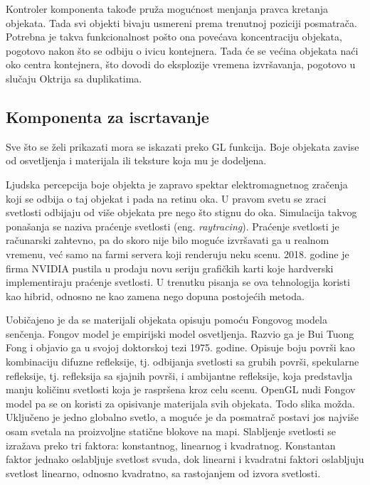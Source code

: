 \documentclass[12pt,oneside]{memoir}
\begin{document}
Kontroler komponenta takođe pruža mogućnost menjanja pravca kretanja objekata. 
Tada svi objekti bivaju usmereni prema trenutnoj poziciji posmatrača. 
Potrebna je takva funkcionalnost pošto ona povećava koncentraciju objekata, 
pogotovo nakon što se odbiju o ivicu kontejnera. Tada će se većina objekata 
naći oko centra kontejnera, što dovodi do eksplozije vremena izvršavanja, pogotovo u slučaju Oktrija sa duplikatima.

\subsection{Komponenta za iscrtavanje}

Sve što se želi prikazati mora se iskazati preko GL funkcija. 
Boje objekata zavise od osvetljenja i materijala ili teksture koja mu je dodeljena.

Ljudska percepcija boje objekta je zapravo spektar elektromagnetnog zračenja koji se odbija o taj objekat i pada na retinu oka.
U pravom svetu se zraci svetlosti odbijaju od više objekata pre nego što stignu do oka. 
Simulacija takvog ponašanja se naziva praćenje svetlosti (eng. {\em raytracing}).  
Praćenje svetlosti je računarski zahtevno, pa do skoro nije bilo moguće izvršavati ga u realnom vremenu, već samo na farmi servera koji renderuju neku scenu.
2018. godine je firma NVIDIA pustila u prodaju novu seriju grafičkih karti koje hardverski implementiraju praćenje svetlosti. 
U trenutku pisanja se ova tehnologija koristi kao hibrid, odnosno ne kao zamena nego dopuna postojećih metoda.

Uobičajeno je da se materijali objekata opisuju pomoću Fongovog modela senčenja. 
Fongov model je empirijski model osvetljenja. Razvio ga je Bui Tuong Fong i objavio ga u svojoj doktorskoj tezi 1975. godine.
Opisuje boju površi kao kombinaciju difuzne refleksije, tj. odbijanja svetlosti sa grubih površi, 
spekularne refleksije, tj. refleksija sa sjajnih površi, i ambijantne refleksije, koja predstavlja manju količinu svetlosti 
koja je raspršena kroz celu scenu.
\cite{Phong} OpenGL nudi Fongov model pa se on koristi za opisivanje materijala svih objekata.
Todo slika možda.
Uključeno je jedno globalno svetlo, a moguće je da posmatrač postavi jos najviše osam svetala na 
proizvoljne statične blokove na mapi. 
Slabljenje svetlosti se izražava preko tri faktora: konstantnog, linearnog i kvadratnog.
Konstantan faktor jednako oslabljuje svetlost svuda, dok linearni i kvadratni faktori oslabljuju svetlost
linearno, odnosno kvadratno, sa rastojanjem od izvora svetlosti.
\end{document}
